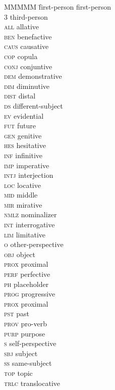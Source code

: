 \documentclass[output=paper]{langscibook}
\begin{document}
\begin{multicols}{2}
\begin{tabbing}
MMMMM \= first-person             \> first-person     \\
3             \> third-person     \\
\textsc{all}  \> allative         \\
\textsc{ben}  \> benefactive      \\
\textsc{caus} \> causative        \\
\textsc{cop}  \> copula           \\
\textsc{conj} \> conjuntive       \\
\textsc{dem}  \> demonstrative    \\
\textsc{dim}  \> diminutive       \\
\textsc{dist} \> distal           \\
\textsc{ds}   \> different-subject\\
\textsc{ev}   \> evidential       \\
\textsc{fut}  \> future           \\
\textsc{gen}  \> genitive         \\
\textsc{hes}  \> hesitative       \\
\textsc{inf}  \> infinitive       \\
\textsc{imp}  \> imperative       \\
\textsc{intj} \> interjection     \\
\textsc{loc}  \> locative         \\
\textsc{mid}  \> middle           \\
\textsc{mir}  \> mirative         \\
\textsc{nmlz} \> nominalizer      \\
\textsc{int}  \> interrogative    \\
\textsc{lim}  \> limitative       \\
\textsc{o}    \> other-perspective\\
\textsc{obj}  \> object           \\
\textsc{prox} \> proximal         \\
\textsc{perf} \> perfective       \\
\textsc{ph}   \> placeholder      \\
\textsc{prog} \> progressive      \\
\textsc{prox} \> proximal         \\
\textsc{pst}  \> past             \\
\textsc{prov} \> pro-verb         \\
\textsc{purp} \> purpose          \\
\textsc{s}    \> self-perspective \\
\textsc{sbj}  \> subject          \\
\textsc{ss}   \> same-subject     \\
\textsc{top}  \> topic            \\
\textsc{trlc} \> translocative
\end{tabbing}
\end{multicols}
\end{document}
